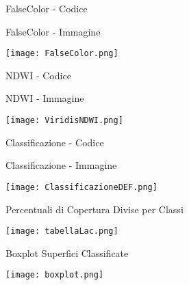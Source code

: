 \documentclass{beamer} %
\begin{document}
        \begin{frame}{FalseColor - Codice}
            
        \end{frame}
        
        \begin{frame}{FalseColor - Immagine}
            \begin{center}
                \texttt{[image: FalseColor.png]}
            \end{center}
        \end{frame}

        \begin{frame}{NDWI - Codice}
            
        \end{frame}

        \begin{frame}{NDWI - Immagine}
            \begin{center}
                \texttt{[image: ViridisNDWI.png]}
            \end{center}
        \end{frame}

        \begin{frame}{Classificazione - Codice}
            
        \end{frame}

        \begin{frame}{Classificazione - Immagine}
            \begin{center}
                \texttt{[image: ClassificazioneDEF.png]}
            \end{center}
        \end{frame}

        \begin{frame}{Percentuali di Copertura Divise per Classi}
            \begin{center}
                \texttt{[image: tabellaLac.png]}
            \end{center} 
        \end{frame}
        
        \begin{frame}{Boxplot Superfici Classificate}
            \begin{center}
                \texttt{[image: boxplot.png]}
            \end{center}
        \end{frame}
\end{document}
